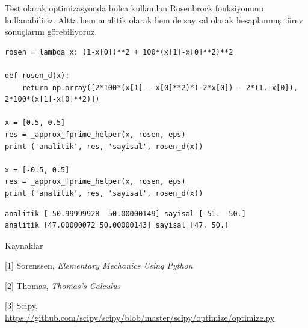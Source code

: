 \documentclass[12pt,fleqn]{article}\usepackage{../../common}
\begin{document}
Test olarak optimizasyonda bolca kullanılan Rosenbrock fonksiyonunu
kullanabiliriz. Altta hem analitik olarak hem de sayısal olarak hesaplanmış
türev sonuçlarını görebiliyoruz,

\begin{verbatim}
rosen = lambda x: (1-x[0])**2 + 100*(x[1]-x[0]**2)**2

def rosen_d(x):
    return np.array([2*100*(x[1] - x[0]**2)*(-2*x[0]) - 2*(1.-x[0]), 2*100*(x[1]-x[0]**2)])

x = [0.5, 0.5]
res = _approx_fprime_helper(x, rosen, eps)
print ('analitik', res, 'sayisal', rosen_d(x))

x = [-0.5, 0.5]
res = _approx_fprime_helper(x, rosen, eps)
print ('analitik', res, 'sayisal', rosen_d(x))
\end{verbatim}

\begin{verbatim}
analitik [-50.99999928  50.00000149] sayisal [-51.  50.]
analitik [47.00000072 50.00000143] sayisal [47. 50.]
\end{verbatim}

Kaynaklar

[1] Sorenssen, {\em Elementary Mechanics Using Python}

[2] Thomas, {\em Thomas's Calculus}

[3] Scipy,
    \url{https://github.com/scipy/scipy/blob/master/scipy/optimize/optimize.py}
\end{document}
